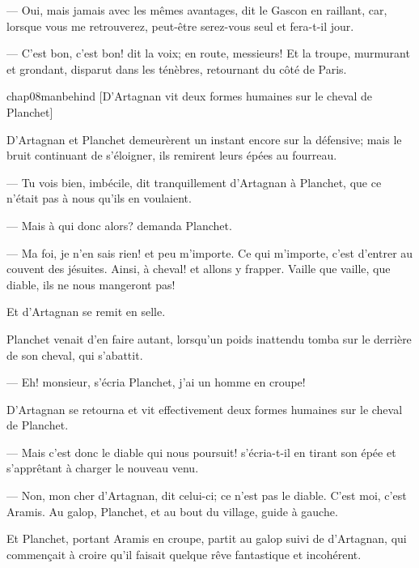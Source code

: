 — Oui, mais jamais avec les mêmes avantages, dit le Gascon en raillant, car, lorsque vous me retrouverez, peut-être serez-vous seul et fera-t-il jour.

— C'est bon, c'est bon! dit la voix; en route, messieurs! Et la troupe, murmurant et grondant, disparut dans les ténèbres, retournant du côté de Paris.

\begin{bwbigpic}
	[\basicscale] 
	{chap08manbehind}
	[D'Artagnan vit deux formes humaines sur le cheval de Planchet]
\end{bwbigpic}

D'Artagnan et Planchet demeurèrent un instant encore sur la défensive; mais le bruit continuant de s'éloigner, ils remirent leurs épées au fourreau.

— Tu vois bien, imbécile, dit tranquillement d'Artagnan à Planchet, que ce n'était pas à nous qu'ils en voulaient.

— Mais à qui donc alors? demanda Planchet.

— Ma foi, je n'en sais rien! et peu m'importe. Ce qui m'importe, c'est d'entrer au couvent des jésuites. Ainsi, à cheval! et allons y frapper. Vaille que vaille, que diable, ils ne nous mangeront pas!

Et d'Artagnan se remit en selle.

Planchet venait d'en faire autant, lorsqu'un poids inattendu tomba sur le derrière de son cheval, qui s'abattit.

— Eh! monsieur, s'écria Planchet, j'ai un homme en croupe!



D'Artagnan se retourna et vit effectivement deux formes humaines sur le cheval de Planchet.

— Mais c'est donc le diable qui nous poursuit! s'écria-t-il en tirant son épée et s'apprêtant à charger le nouveau venu.

— Non, mon cher d'Artagnan, dit celui-ci; ce n'est pas le diable. C'est moi, c'est Aramis. Au galop, Planchet, et au bout du village, guide à gauche.

Et Planchet, portant Aramis en croupe, partit au galop suivi de d'Artagnan, qui commençait à croire qu'il faisait quelque rêve fantastique et incohérent.
